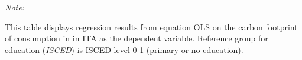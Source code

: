 \begin{table}[htbp!]
\begin{adjustbox}{width = 1\textwidth, max height = 0.95\textheight, center}
\begin{threeparttable}[b]
         \begin{tablenotes}\item \medskip \textit{Note:}
            \item This table displays regression results from equation OLS on the carbon footprint of consumption in  in ITA as the dependent variable.  Reference group for education (\textit{ISCED}) is ISCED-level 0-1 (primary or no education).
         \end{tablenotes}
      \end{threeparttable}
   \end{adjustbox}
\end{table}


